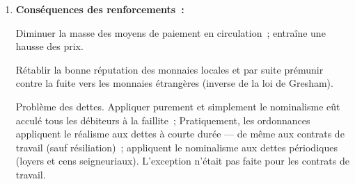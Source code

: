 \documentclass[french,twoside]{book} %
\begin{document}
\begin{enumerate}[itemsep=\baselineskip,]
\item  \textbf{Conséquences des renforcements :}\par
 Diminuer la masse des moyens de paiement en circulation ; entraîne une hausse des prix.\par
 Rétablir la bonne réputation des monnaies locales et par suite prémunir contre la fuite vers les monnaies étrangères (inverse de la loi de Gresham).\par
 Problème des dettes. Appliquer purement et simplement le nominalisme eût acculé tous les débiteurs à la faillite ; Pratiquement, les ordonnances appliquent le réalisme aux dettes à courte durée — de même aux contrats de travail (sauf résiliation) ; appliquent le nominalisme aux dettes périodiques (loyers et cens seigneuriaux). L’exception n’était pas faite pour les contrats de travail.
 
\end{enumerate}
\end{document}
